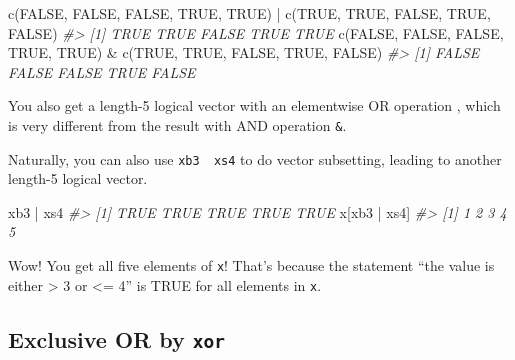 \documentclass[
]{book}
\newenvironment{Shaded}{\begin{snugshade}}{\end{snugshade}}
\newcommand{\CommentTok}[1]{\textcolor[rgb]{0.56,0.35,0.01}{\textit{#1}}}
\newcommand{\ConstantTok}[1]{\textcolor[rgb]{0.00,0.00,0.00}{#1}}
\newcommand{\FunctionTok}[1]{\textcolor[rgb]{0.00,0.00,0.00}{#1}}
\newcommand{\NormalTok}[1]{#1}
\newcommand{\SpecialCharTok}[1]{\textcolor[rgb]{0.00,0.00,0.00}{#1}}
\begin{document}
\begin{Shaded}
\begin{Highlighting}[]
\FunctionTok{c}\NormalTok{(}\ConstantTok{FALSE}\NormalTok{, }\ConstantTok{FALSE}\NormalTok{, }\ConstantTok{FALSE}\NormalTok{, }\ConstantTok{TRUE}\NormalTok{, }\ConstantTok{TRUE}\NormalTok{) }\SpecialCharTok{|} \FunctionTok{c}\NormalTok{(}\ConstantTok{TRUE}\NormalTok{, }\ConstantTok{TRUE}\NormalTok{, }\ConstantTok{FALSE}\NormalTok{, }\ConstantTok{TRUE}\NormalTok{, }\ConstantTok{FALSE}\NormalTok{)}
\CommentTok{\#\textgreater{} [1]  TRUE  TRUE FALSE  TRUE  TRUE}
\FunctionTok{c}\NormalTok{(}\ConstantTok{FALSE}\NormalTok{, }\ConstantTok{FALSE}\NormalTok{, }\ConstantTok{FALSE}\NormalTok{, }\ConstantTok{TRUE}\NormalTok{, }\ConstantTok{TRUE}\NormalTok{) }\SpecialCharTok{\&} \FunctionTok{c}\NormalTok{(}\ConstantTok{TRUE}\NormalTok{, }\ConstantTok{TRUE}\NormalTok{, }\ConstantTok{FALSE}\NormalTok{, }\ConstantTok{TRUE}\NormalTok{, }\ConstantTok{FALSE}\NormalTok{)}
\CommentTok{\#\textgreater{} [1] FALSE FALSE FALSE  TRUE FALSE}
\end{Highlighting}
\end{Shaded}

You also get a length-5 logical vector with an elementwise OR operation \texttt{\textbar{}}, which is very different from the result with AND operation \texttt{\&}.

Naturally, you can also use \texttt{xb3\ \textbar{}\ xs4} to do vector subsetting, leading to another length-5 logical vector.

\begin{Shaded}
\begin{Highlighting}[]
\NormalTok{xb3 }\SpecialCharTok{|}\NormalTok{ xs4}
\CommentTok{\#\textgreater{} [1] TRUE TRUE TRUE TRUE TRUE}
\NormalTok{x[xb3 }\SpecialCharTok{|}\NormalTok{ xs4]}
\CommentTok{\#\textgreater{} [1] 1 2 3 4 5}
\end{Highlighting}
\end{Shaded}

Wow! You get all five elements of \texttt{x}! That's because the statement ``the value is either \textgreater{} 3 or \textless= 4'' is TRUE for all elements in \texttt{x}.

\hypertarget{exclusive-or-by-xor}{%
\subsection{\texorpdfstring{Exclusive OR by \texttt{xor}}{Exclusive OR by xor}}\label{exclusive-or-by-xor}}
\end{document}
